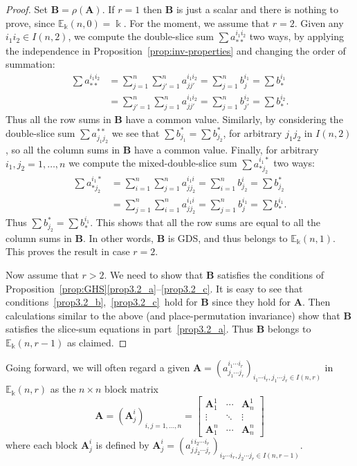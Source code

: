 \documentclass[ALCO,ThmDefs,Unicode,epreuves]{cedram}
\newcommand{\E}{\mathbb{E}}
\newcommand{\bA}{\mathbf{A}}
\newcommand{\bB}{\mathbf{B}}
\begin{document}
\begin{proof}
Set $\bB = \rho(\bA)$. If $r=1$ then $\bB$ is just a scalar and there
is nothing to prove, since $\E_\Bbbk(n,0) = \Bbbk$. For the moment, we
assume that $r=2$. Given any $i_1i_2 \in I(n,2)$, we compute the
double-slice sum $\sum a^{i_1i_2}_{**}$ two ways, by applying the
independence in Proposition~\ref{prop:inv-properties} and changing
the order of summation:
\begin{align*}
\sum a^{i_1i_2}_{**} &= \sum_{j=1}^n \sum_{j'=1}^n a^{i_1i_2}_{jj'} =
\sum_{j=1}^n b^{i_1}_j = \sum b^{i_1}_*\\
&= \sum_{j'=1}^n \sum_{j=1}^n a^{i_1i_2}_{jj'} =
\sum_{j=1}^n b^{i_2}_{j'} = \sum b^{i_2}_* .
\end{align*}
Thus all the row sums in $\bB$ have a common value. Similarly, by
considering the double-slice sum $\sum a^{**}_{j_1j_2}$ we see that
$\sum b^*_{j_1} = \sum b^*_{j_2}$, for arbitrary $j_1j_2$ in $I(n,2)$,
so all the column sums in $\bB$ have a common value. Finally, for
arbitrary $i_1, j_2 = 1, \dots, n$ we compute the mixed-double-slice
sum $\sum a^{i_1*}_{*j_2}$ two ways:
\begin{align*}
\sum a^{i_1*}_{*j_2} &= \sum_{i=1}^n \sum_{j=1}^n a^{i_1i}_{jj_2} =
\sum_{i=1}^n b^{i}_{j_2} = \sum b^{*}_{j_2}\\
&= \sum_{j=1}^n \sum_{i=1}^n a^{i_1i}_{jj_2} =
\sum_{j=1}^n b^{i_1}_{j} = \sum b^{i_1}_* .
\end{align*}
Thus $\sum b^{*}_{j_2} = \sum b^{i_1}_{*}$. This shows that all the
row sums are equal to all the column sums in $\bB$. In other words,
$\bB$ is GDS, and thus belongs to $\E_\Bbbk(n,1)$. This proves the
result in case $r=2$.

Now assume that $r>2$. We need to show that $\bB$ satisfies the
conditions of Proposition~\ref{prop:GHS}\ref{prop3.2_a}--\ref{prop3.2_c}. It is easy to see
that conditions~\ref{prop3.2_b},~\ref{prop3.2_c}~hold for $\bB$ since they hold for
$\bA$. Then calculations similar to the above (and place-permutation
invariance) show that $\bB$ satisfies the slice-sum equations in part~\ref{prop3.2_a}. Thus $\bB$ belongs to $\E_\Bbbk(n,r-1)$ as claimed.
\end{proof}

Going forward, we will often regard a given $\bA = (a^{i_1
 \cdots i_r}_{j_1 \cdots j_r})_{i_1 \cdots i_r, j_1 \cdots j_r \in
 I(n,r)}$ in $\E_\Bbbk(n,r)$ as the $n \times n$ block matrix
\begin{equation}\label{eq:blocks}
\bA = (\bA^i_j)_{i,j = 1, \dots,n} = 
\begin{bmatrix}
 \bA^1_1 & \cdots & \bA^1_n \\
 \vdots & \ddots & \vdots \\
 \bA^n_1 & \cdots & \bA^n_n
\end{bmatrix}
\end{equation}
where each block $\bA^i_j$ is defined by $\bA^i_j = (a^{i\, i_2 \cdots
 i_r}_{j\, j_2 \cdots j_r})_{i_2 \cdots i_r, j_2 \cdots j_r \in
 I(n,r-1)}$.
\end{document}
